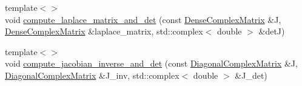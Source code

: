 \begin{DoxyCompactItemize}
\item 
{\footnotesize template$<$$>$ }\\void \hyperlink{classoomph_1_1PMLElementBase_a73f3ec373836f40e8668de5dfa87122b}{compute\+\_\+laplace\+\_\+matrix\+\_\+and\+\_\+det} (const \hyperlink{classoomph_1_1DenseComplexMatrix}{Dense\+Complex\+Matrix} \&J, \hyperlink{classoomph_1_1DenseComplexMatrix}{Dense\+Complex\+Matrix} \&laplace\+\_\+matrix, std\+::complex$<$ double $>$ \&detJ)
\item 
{\footnotesize template$<$$>$ }\\void \hyperlink{classoomph_1_1PMLElementBase_abcf05a9e0b74b421c91765a9303330f5}{compute\+\_\+jacobian\+\_\+inverse\+\_\+and\+\_\+det} (const \hyperlink{classoomph_1_1DiagonalComplexMatrix}{Diagonal\+Complex\+Matrix} \&J, \hyperlink{classoomph_1_1DiagonalComplexMatrix}{Diagonal\+Complex\+Matrix} \&J\+\_\+inv, std\+::complex$<$ double $>$ \&J\+\_\+det)
\end{DoxyCompactItemize}
